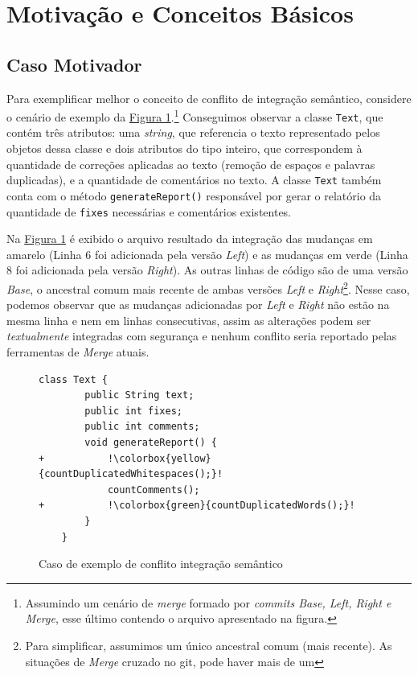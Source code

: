 \section{Motivação e Conceitos Básicos}
\subsection{Caso Motivador}
Para exemplificar melhor o conceito de conflito de integração semântico, considere o cenário de exemplo da \hyperref[fig:codigo-motivador]{Figura 1}.\footnote{Assumindo um cenário de \emph{merge} formado por \emph{commits Base, Left, Right e Merge}, esse último contendo o arquivo apresentado na figura.} Conseguimos observar a classe \texttt{Text}, que contém três atributos: uma \emph{string}, que referencia o texto representado pelos objetos dessa classe e dois atributos do tipo inteiro, que correspondem à quantidade de correções aplicadas ao texto (remoção de espaços e palavras duplicadas), e a quantidade de comentários no texto. A classe \texttt{Text} também conta com o método \texttt{generateReport()} responsável por gerar o relatório da quantidade de \texttt{fixes} necessárias e comentários existentes.

Na \hyperref[fig:codigo-motivador]{Figura 1} é exibido o arquivo resultado da integração das mudanças em amarelo (Linha 6 foi adicionada pela versão \emph{Left}) e as mudanças em verde (Linha 8 foi adicionada pela versão \emph{Right}). As outras linhas de código são de uma versão \emph{Base}, o ancestral comum mais recente de ambas versões \emph{Left} e \emph{Right}\footnote{Para simplificar, assumimos um único ancestral comum (mais recente). As situações de \emph{Merge} cruzado no git, pode haver mais de um}. Nesse caso, podemos observar que as mudanças adicionadas por \emph{Left} e \emph{Right} não estão na mesma linha e nem em linhas consecutivas, assim as alterações podem ser \emph{textualmente} integradas com segurança e nenhum conflito seria reportado pelas ferramentas de \emph{Merge} atuais. 

\begin{figure}[!h]
    \begin{lstlisting}[escapechar=!]
    class Text {
        public String text;
        public int fixes;
        public int comments;
        void generateReport() {
+           !\colorbox{yellow}{countDuplicatedWhitespaces();}!
            countComments();
+           !\colorbox{green}{countDuplicatedWords();}!
        }
    }
    \end{lstlisting}
    \caption{Caso de exemplo de conflito integração semântico}
    \label{fig:codigo-motivador}
\end{figure}

